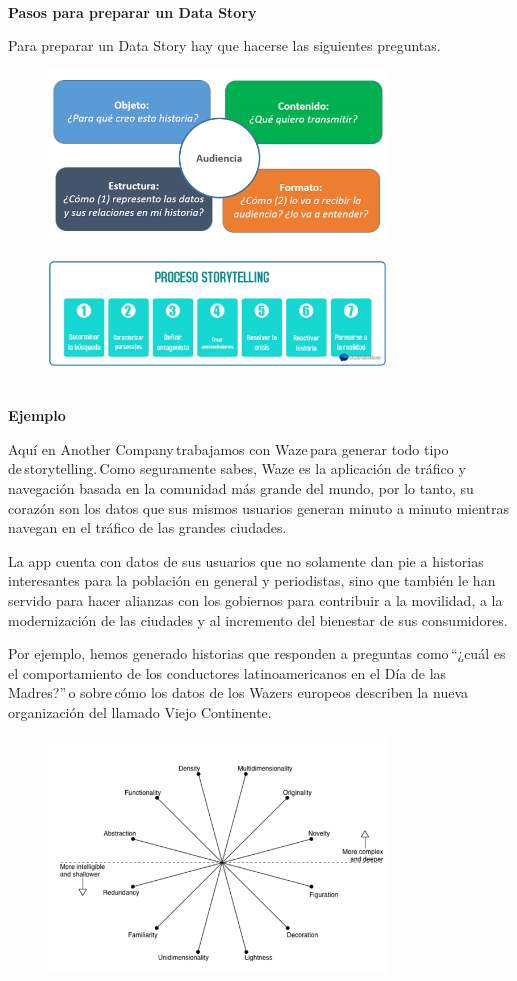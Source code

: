 \documentclass[a4paper,12pt,twocolumn]{article}
\begin{document}
\textbf{}\\
\textbf{Pasos para preparar un Data Story}
\item Para preparar un Data Story hay que hacerse las siguientes preguntas.
\begin{figure}[h!]
\centering
\includegraphics[width=9cm]{./Imagenes/img11}
\end{figure}
\begin{figure}[h!]
\centering
\includegraphics[width=9cm]{./Imagenes/img10}
\end{figure}
\textbf{}\\
\textbf{Ejemplo}\\
\item{Aquí en Another Company trabajamos con Waze para generar todo tipo de storytelling. Como seguramente sabes, Waze es la aplicación de tráfico y navegación basada en la comunidad más grande del mundo, por lo tanto, su corazón son los datos que sus mismos usuarios generan minuto a minuto mientras navegan en el tráfico de las grandes ciudades. 

La app cuenta con datos de sus usuarios que no solamente dan pie a historias interesantes para la población en general y periodistas, sino que también le han servido para hacer alianzas con los gobiernos para contribuir a la movilidad, a la modernización de las ciudades y al incremento del bienestar de sus consumidores. 

Por ejemplo, hemos generado historias que responden a preguntas como “¿cuál es el comportamiento de los conductores latinoamericanos en el Día de las Madres?” o sobre cómo los datos de los Wazers europeos describen la nueva organización del llamado Viejo Continente. }

\begin{figure}[h!]
\centering
\includegraphics[width=9cm]{./Imagenes/Ejemplo1}
\end{figure}
		
\end{document}
